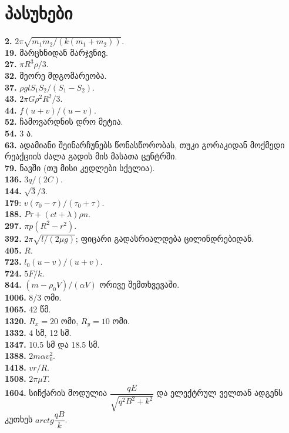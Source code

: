 \documentclass[12pt,a4paper,]{report}
\begin{document}
\chapter{პასუხები}
\textbf{2.} $2\pi\sqrt{m_1 m_2 / (k(m_1 + m_2))}$. \\
\textbf{19.} მარცხნიდან მარჯვნივ. \\
\textbf{27.} $\pi R^3 \rho /3$. \\
\textbf{32.} მეორე მდგომარეობა. \\
\textbf{37.} $\rho glS_1S_2/(S_1-S_2)$. \\
\textbf{43.} $2\pi G\rho^2R^2/3.$ \\
\textbf{44.} $f(u + v)/(u - v)$. \\
\textbf{52.} ჩამოვარდნის დრო მეტია. \\
\textbf{54.} 3 ა. \\
\textbf{63.} ადამიანი შეინარჩუნებს წონასწორობას, თუკი გორაკიდან მოქმედი რეაქციის ძალა გადის მის მასათა ცენტრში. \\
\textbf{79.} ნავში (თუ მისი კედლები სქელია). \\
\textbf{136.} $3q/(2C)$. \\
\textbf{144.} $\sqrt{3}/3$. \\ 
\textbf{179}: $v(\tau_0-\tau)/(\tau_0+\tau)$. \\
\textbf{188.} $P\tau+(ct+\lambda)\rho n$. \\
\textbf{297.} $\pi p(R^2-r^2)$. \\
\textbf{392.} $2\pi\sqrt{l/(2\mu g)}$; ფიცარი გადასრიალდება ცილინდრებიდან. \\
\textbf{405.} $R$. \\
\textbf{723.} $l_0(u-v)/(u+v)$. \\
\textbf{724.} $5F/k$. \\
\textbf{844.} $(m-\rho_0 V)/(\alpha V)$ ორივე შემთხვევაში.\\
\textbf{1006.} 8/3 ომი. \\
\textbf{1065.} 42 წმ. \\
\textbf{1320.} $R_x=20$ ომი, $R_y=10$ ომი.\\
\textbf{1332.} 4 სმ, 12 სმ. \\
\textbf{1347.} 10.5 სმ და 18.5 სმ. \\
\textbf{1388.} $2m\alpha v_0^2$. \\
\textbf{1418.} $vr/R$. \\
\textbf{1508.} $2\pi\mu T$. \\
\textbf{1604.} სიჩქარის მოდულია $\dfrac{qE}{\sqrt{q^2B^2 + k^2}}$ და ელექტრულ ველთან ადგენს კუთხეს $arctg\dfrac{qB}{k}$. \\
\end{document}

